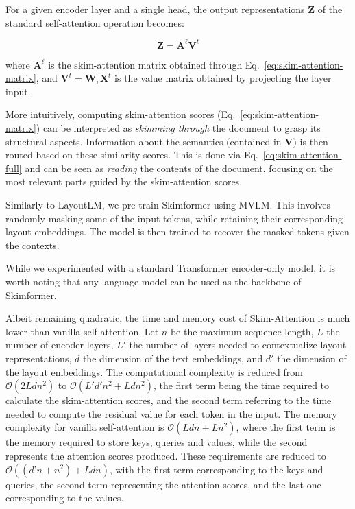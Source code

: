 For a given encoder layer and a single head, the output representations $\bm{Z}$ of the standard self-attention operation becomes:

\begin{equation}
\label{eq:skim-attention-full}
	\bm{Z} = \bm{A}^{\ell} \bm{V}^{t}
\end{equation}

\noindent where $\bm{A}^{\ell}$ is the skim-attention matrix obtained through Eq.~\ref{eq:skim-attention-matrix}, and $\bm{V}^{t} = \bm{W}_{v} \bm{X}^t$ is the value matrix obtained by projecting the layer input.

More intuitively, computing skim-attention scores (Eq.~\ref{eq:skim-attention-matrix}) can be interpreted as \textit{skimming through} the document to grasp its structural aspects. Information about the semantics (contained in $\bm{V}$) is then routed based on these similarity scores. This is done via Eq.~\ref{eq:skim-attention-full} and can be seen as \textit{reading} the contents of the document, focusing on the most relevant parts guided by the skim-attention scores.

Similarly to LayoutLM, we pre-train Skimformer using \ac{MVLM}. This involves randomly masking some of the input tokens, while retaining their corresponding layout embeddings. The model is then trained to recover the masked tokens given the contexts. 

While we experimented with a standard Transformer encoder-only model, it is worth noting that any language model can be used as the backbone of Skimformer.

Albeit remaining quadratic, the time and memory cost of Skim-Attention is much lower than vanilla self-attention. Let $n$ be the maximum sequence length, $L$ the number of encoder layers, $L'$ the number of layers needed to contextualize layout representations, $d$ the dimension of the text embeddings, and $d'$ the dimension of the layout embeddings. The computational complexity is reduced from $\mathcal{O}(2Ldn^2)$ to $\mathcal{O}(L'd'n^2 + Ldn^2)$, the first term being the time required to calculate the skim-attention scores, and the second term referring to the time needed to compute the residual value for each token in the input. The memory complexity for vanilla self-attention is $\mathcal{O}(Ldn + Ln^2)$, where the first term is the memory required to store keys, queries and values, while the second represents the attention scores produced. These requirements are reduced to $\mathcal{O}((d’n + n^2) + Ldn)$, with the first term corresponding to the keys and queries, the second term representing the attention scores, and the last one corresponding to the values.


